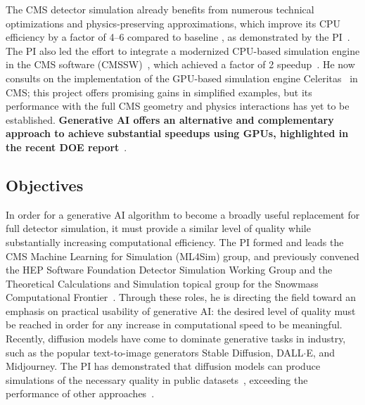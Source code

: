 The CMS detector simulation already benefits from numerous technical optimizations and physics-preserving approximations,
which improve its CPU efficiency by a factor of 4--6 compared to baseline \GEANTfour, as demonstrated by the PI~\cite{Pedro:2019mkq}.
The PI also led the effort to integrate a modernized CPU-based simulation engine in the CMS software (CMSSW)~\cite{Pedro:2020kbk},
which achieved a factor of 2 speedup~\cite{Amadio:2020ink}.
He now consults on the implementation of the GPU-based simulation engine Celeritas~\cite{Tognini:2022nmd} in CMS;
this project offers promising gains in simplified examples, but its performance with the full CMS geometry and physics interactions has yet to be established.
\textbf{Generative AI offers an alternative and complementary approach to achieve substantial speedups using GPUs, highlighted in the recent DOE report}~\cite{AI4SES}.

\subsection{Objectives}\label{subsec:simobj}

In order for a generative AI algorithm to become a broadly useful replacement for full detector simulation,
it must provide a similar level of quality while substantially increasing computational efficiency.
The PI formed and leads the CMS Machine Learning for Simulation (ML4Sim) group, and previously convened the HEP Software Foundation Detector Simulation Working Group
and the Theoretical Calculations and Simulation topical group for the Snowmass Computational Frontier~\cite{Boyle:2022cvo,Elvira:2022wyn}.
Through these roles, he is directing the field toward an emphasis on practical usability of generative AI:
the desired level of quality must be reached in order for any increase in computational speed to be meaningful.
Recently, diffusion models have come to dominate generative tasks in industry, such as the popular text-to-image generators Stable Diffusion, DALL${\cdot}$E, and Midjourney.
The PI has demonstrated that diffusion models can produce simulations of the necessary quality in public datasets~\cite{Amram:2023onf},
exceeding the performance of other approaches~\cite{Adelmann:2022ozp,Hashemi:2023rgo}.

